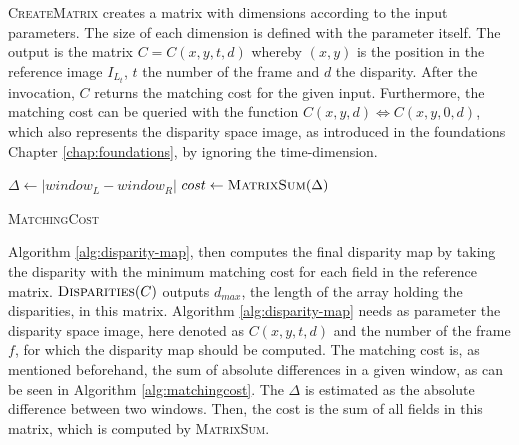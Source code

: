 \noindent \textsc{CreateMatrix} creates a matrix with dimensions according to the input parameters.
The size of each dimension is defined with the parameter itself.
The output is the matrix $C = C(x,y,t,d)$ whereby $(x,y)$ is the position in the reference image $I_{L_{t}}$, $t$ the number of the frame and $d$ the disparity.
After the invocation, $C$ returns the matching cost for the given input.
Furthermore, the matching cost can be queried with the function $C(x,y,d) \iff C(x,y,0,d)$, which also represents the disparity space image, as introduced in the foundations Chapter \ref{chap:foundations}, by ignoring the time-dimension.

\begin{algorithm}[h!]
\DontPrintSemicolon
{}
$\Delta \gets |window_{L} - window_{R}|$\;
$cost \gets \textsc{MatrixSum}(\Delta)$\;
\;
\caption{\textsc{MatchingCost}}
\label{alg:matchingcost}
\end{algorithm}

\noindent Algorithm \ref{alg:disparity-map}, then computes the final disparity map by taking the disparity with the minimum matching cost for each field in the reference matrix.
$\textsc{Disparities}(C)$ outputs $d_{max}$, the length of the array holding the disparities, in this matrix.
Algorithm \ref{alg:disparity-map} needs as parameter the disparity space image, here denoted as $C(x,y,t,d)$ and the number of the frame $f$, for which the disparity map should be computed.
The matching cost is, as mentioned beforehand, the sum of absolute differences in a given window, as can be seen in Algorithm \ref{alg:matchingcost}.
The $\Delta$ is estimated as the absolute difference between two windows.
Then, the cost is the sum of all fields in this matrix, which is computed by \textsc{MatrixSum}.

